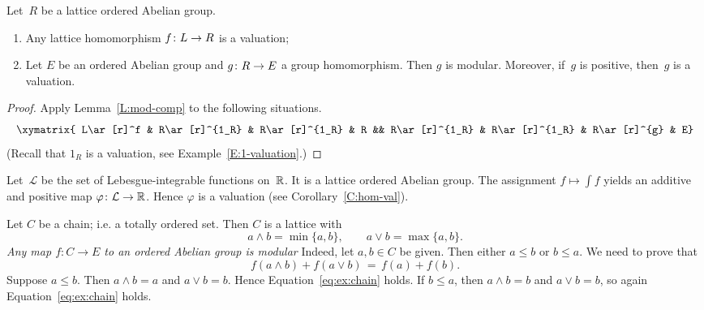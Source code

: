 \documentclass[main.tex]{subfiles}
\begin{document}
\begin{cor}
\label{C:hom-val}
Let~$R$ be a lattice ordered Abelian group.
\begin{enumerate}
\item
\label{C:hom-val-lat}
Any lattice homomorphism $f\colon L\rightarrow R$ 
is a valuation;

\item
\label{C:hom-val-group}
Let $E$ be an ordered Abelian group
and $g\colon R\rightarrow E$ a group homomorphism.
Then $g$ is modular.
Moreover,
if~$g$ is positive,
then~$g$ is a valuation.
\end{enumerate}
\end{cor}
\begin{proof}
Apply Lemma~\ref{L:mod-comp} to the following situations.
\begin{equation*}
\xymatrix{
L\ar[r]^f &
R\ar[r]^{1_R} &
R\ar[r]^{1_R} &
R &&
R\ar[r]^{1_R} &
R\ar[r]^{1_R} &
R\ar[r]^{g} &
E}
\end{equation*}
(Recall that $1_R$ is a valuation,
see Example~\ref{E:1-valuation}.)
\end{proof}

\begin{ex}
\label{E:int-val}
Let~$\mathcal{L}$ be the set of Lebesgue-integrable functions on~$\mathbb{R}$.
It is a lattice ordered Abelian group.
The assignment $f\mapsto \int f$
yields an additive and positive map $\varphi\colon \mathcal{L}\rightarrow \mathbb{R}$.
Hence $\varphi$ is a valuation (see Corollary~\ref{C:hom-val}).
\end{ex}

\begin{ex}
Let $C$ be a chain;
i.e. a totally ordered set.
Then $C$ is a lattice with
\begin{equation*}
a\wedge b = \min\{a,b\},
 \qquad 
a\vee b = \max\{a,b\}.
\end{equation*}
\emph{Any map $f\colon C\rightarrow E$
to an ordered Abelian group is modular}
Indeed,
let $a,b\in C$ be given.
Then either $a\leq b$ or $b\leq a$.
We need to prove that 
\begin{equation}
\label{eq:ex:chain}
f(a\wedge b) + f(a \vee b) \,=\, f(a) + f(b).
\end{equation}
Suppose $a\leq b$. Then $a\wedge b = a$ and $a \vee b= b$.
Hence Equation~\eqref{eq:ex:chain} holds.  
If $b\leq a$, then $a\wedge b = b$ and $a \vee b = b$,
so again Equation~\eqref{eq:ex:chain} holds.
\end{ex}

%
%
%
%
\end{document}
